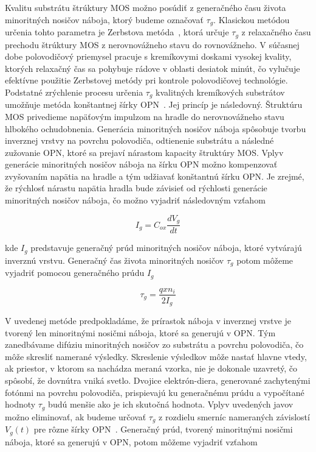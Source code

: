 Kvalitu substrátu štrúktury MOS možno posúdiť z generačného času
života minoritných nosičov náboja, ktorý budeme označovať
$\tau_g$. Klasickou metódou určenia tohto parametra je Zerbstova
metóda~\cite{3.2}, ktorá určuje $\tau_g$ z relaxačného času prechodu
štrúktury MOS z nerovnovážneho stavu do rovnovážneho. V súčasnej dobe
polovodičový priemysel pracuje s kremíkovymi doskami vysokej kvality,
ktorých relaxačný čas sa pohybuje rádove v oblasti desiatok minút, čo
vylučuje efektívne použitie Zerbstovej metódy pri kontrole
polovodičovej technológie. Podstatné zrýchlenie procesu určenia
$\tau_g$ kvalitných kremíkových substrátov umožňuje metóda konštantnej
šírky OPN~\cite{3.1}. Jej princíp je následovný.  Štruktúru MOS
privedieme napäťovým impulzom na hradle do nerovnovážneho stavu
hlbokého ochudobnenia. Generácia minoritných nosičov náboja spôsobuje
tvorbu inverznej vrstvy na povrchu polovodiča, odtienenie substrátu a
následné zužovanie OPN, ktoré sa prejaví nárastom kapacity štruktúry
MOS\@. Vplyv generácie minoritných nosičov náboja na šírku OPN možno
kompenzovať zvyšovaním napätia na hradle a tým udžiavať konštantnú
šírku OPN\@. Je zrejmé, že rýchlosť nárastu napätia hradla bude závisieť
od rýchlosti generácie minoritných nosičov náboja, čo možno vyjadriť
následovným vzťahom~\cite{3.3}

\begin{equation}\label{eq:3.4}
  I_g = C_{ox} \frac{dV_g}{dt}
\end{equation}

kde $I_g$ predstavuje generačný prúd minoritných nosičov náboja, ktoré
vytvárajú inverznú vrstvu.  Generačný čas života minoritných nosičov
$\tau_g$ potom môžeme vyjadriť pomocou generačného prúdu $I_g$~\cite{3.3}

\begin{equation}\label{eq:3.5}
  \tau_g = \frac{qxn_i}{2I_g}
\end{equation}

V uvedenej metóde predpokladáme, že prírastok náboja v inverznej
vrstve je tvorený len minoritnými nosičmi náboja, ktoré sa generujú v
OPN\@. Tým zanedbávame difúziu minoritných nosičov zo substrátu a
povrchu polovodiča, čo môže skresliť namerané výsledky. Skreslenie
výsledkov môže nastať hlavne vtedy, ak priestor, v ktorom sa nachádza
meraná vzorka, nie je dokonale uzavretý, čo spôsobí, že dovnútra vniká
svetlo.  Dvojice elektrón-diera, generované zachytenými fotónmi na
povrchu polovodiča, prispievajú ku generačnému prúdu a vypočítané
hodnoty $\tau_g$ budú menšie ako je ich skutočná hodnota.  Vplyv
uvedených javov možno eliminovať, ak budeme určovať $\tau_g$ z
rozdielu smerníc nameraných závislostí $V_g(t)$ pre rôzne šírky
OPN~\cite{3.3, 3.10, 3.11, 3.12}. Generačný prúd, tvorený minoritnými
nosičmi náboja, ktoré sa generujú v OPN, potom môžeme vyjadriť vzťahom

